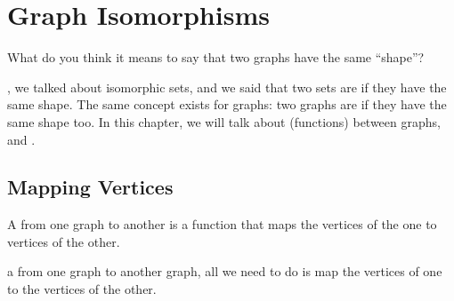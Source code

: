 \documentclass[../../../main.tex]{subfiles}
\begin{document}
\chapter{Graph Isomorphisms}
\label{ch:graph-isomorphisms}

\begin{ponder}
  What do you think it means to say that two graphs have the same ``shape''?
\end{ponder}

, we talked about isomorphic sets, and we said that two sets are  if they have the same shape. The same concept exists for graphs: two graphs are  if they have the same shape too. In this chapter, we will talk about  (functions) between graphs, and .


\section{Mapping Vertices}

\begin{terminology}
  A  from one graph to another is a function that maps the vertices of the one to vertices of the other.
\end{terminology}

 a  from one graph to another graph, all we need to do is map the vertices of one to the vertices of the other. 
\end{document}
